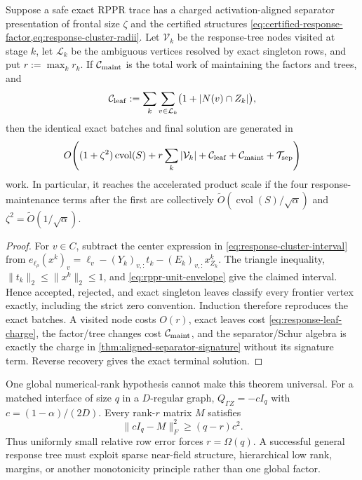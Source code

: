 \begin{theorem}
\label{thm:certified-response-tree}
Suppose a safe exact RPPR trace has a charged activation-aligned separator
presentation of frontal size $\zeta$ and the certified structures
\cref{eq:certified-response-factor,eq:response-cluster-radii}.  Let
$\mathcal V_k$ be the response-tree nodes visited at stage $k$, let
$\mathcal L_k$ be the ambiguous vertices resolved by exact singleton rows,
and put $r:=\max_kr_k$.  If $\mathcal C_{\rm maint}$ is the total work of
maintaining the factors and trees, and
\begin{equation}
 \mathcal C_{\rm leaf}
 :=\sum_k\sum_{v\in\mathcal L_k}
   \bigl(1+|N(v)\cap Z_k|\bigr),
 \label{eq:response-leaf-charge}
\end{equation}
then the identical exact batches and final solution are generated in
\begin{equation}
 O\!\left(
  (1+\zeta^2)\operatorname{cvol}(S)
  +r\sum_k|\mathcal V_k|
  +\mathcal C_{\rm leaf}+\mathcal C_{\rm maint}
  +\mathcal T_{\rm sep}
 \right)
 \label{eq:certified-response-tree-work}
\end{equation}
work.  In particular, it reaches the accelerated product scale if the four
response-maintenance terms after the first are collectively
$\widetilde O(\operatorname{cvol}(S)/\sqrt\alpha)$ and
$\zeta^2=\widetilde O(1/\sqrt\alpha)$.
\end{theorem}

\begin{proof}
For $v\in C$, subtract the center expression in
\cref{eq:response-cluster-interval} from
$e_{\ell_\rho}(x^k)_v=\ell_v-(Y_k)_{v,:}t_k-(E_k)_{v,:}x^k_{Z_k}$.
The triangle inequality, $\|t_k\|_2\leq\|x^k\|_2\leq1$, and
\cref{eq:rppr-unit-envelope} give the claimed interval.  Hence accepted,
rejected, and exact singleton leaves classify every frontier vertex exactly,
including the strict zero convention.  Induction therefore reproduces the
exact batches.  A visited node costs $O(r)$, exact leaves cost
\cref{eq:response-leaf-charge}, the factor/tree changes cost
$\mathcal C_{\rm maint}$, and the separator/Schur algebra is exactly the
charge in \cref{thm:aligned-separator-signature} without its signature term.
Reverse recovery gives the exact terminal solution.
\end{proof}

One global numerical-rank hypothesis cannot make this theorem universal.
For a matched interface of size $q$ in a $D$-regular graph,
$Q_{\Gamma Z}=-cI_q$ with $c=(1-\alpha)/(2D)$.  Every rank-$r$ matrix $M$
satisfies
\begin{equation}
 \|cI_q-M\|_F^2\geq(q-r)c^2.
 \label{eq:matched-interface-rank-obstruction}
\end{equation}
Thus uniformly small relative row error forces $r=\Omega(q)$.  A successful
general response tree must exploit sparse near-field structure, hierarchical
low rank, margins, or another monotonicity principle rather than one global
factor.
